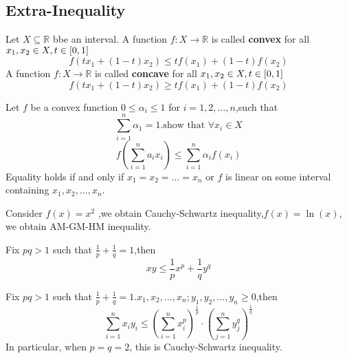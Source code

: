 \documentclass{book}
\numberwithin{equation}{section}
\begin{document}
\subsection{Extra-Inequality}
\begin{definitionenv}
    Let $X\subseteq \mathbb{R}$ bbe an interval.
    \newline 
    A function $f:X\rightarrow \mathbb{R}$ is called \textbf{convex} for all $x_1,x_2\in X,t\in \interval{0}{1}$
    $$f(tx_1+(1-t)x_2)\le tf(x_1)+(1-t)f(x_2)$$
    \newline
    A function $f:X\rightarrow \mathbb{R}$ is called \textbf{concave} for all $x_1,x_2\in X,t\in \interval{0}{1}$
    $$f(tx_1+(1-t)x_2)\ge tf(x_1)+(1-t)f(x_2)$$
\end{definitionenv}
\begin{theoremenv}
    Let $f$ be a convex function $0\le \alpha_i\le 1$ for $i=1,2,\dots ,n$,such that 
    $$\sum_{i=1}^{n}\alpha_1=1.\text{show that } \forall x_i\in X$$
    $$f\left(\sum_{i=1}^{n}a_ix_i\right)\le \sum_{i=1}^{n}\alpha_if(x_i)$$
    Equality holds if and only if $x_1=x_2=\dots =x_n$ or $f$ is linear on some interval containing $x_1,x_2,\dots,x_n$.
\end{theoremenv}
\begin{remark}
    Consider $f(x)=x^2$ ,we obtain Cauchy-Schwartz inequality,$f(x)=\ln (x)$, we obtain AM-GM-HM inequality.
\end{remark}
\begin{theoremenv}
    \quad
    \newline
    Fix $pq>1$ such that $\frac{1}{p}+\frac{1}{q}=1$,then
    $$xy\le \frac{1}{p}x^p+\frac{1}{q}y^q$$
\end{theoremenv}
\begin{theoremenv}
    \quad
    \newline
    Fix $pq>1$ such that $\frac{1}{p}+\frac{1}{q}=1$.$x_1,x_2,\dots,x_n;y_1,y_2,\dots,y_n\ge 0$,then
    $$\sum_{i=1}^{n}x_iy_i\le \left(\sum_{i=1}^{n}x_i^p\right)^{\frac{1}{p}}\cdot\left(\sum_{j=1}^{n}y_j^q\right)^{\frac{1}{q}}$$
    In particular, when $p=q=2$, this is Cauchy-Schwartz inequality.
\end{theoremenv}
\end{document}
